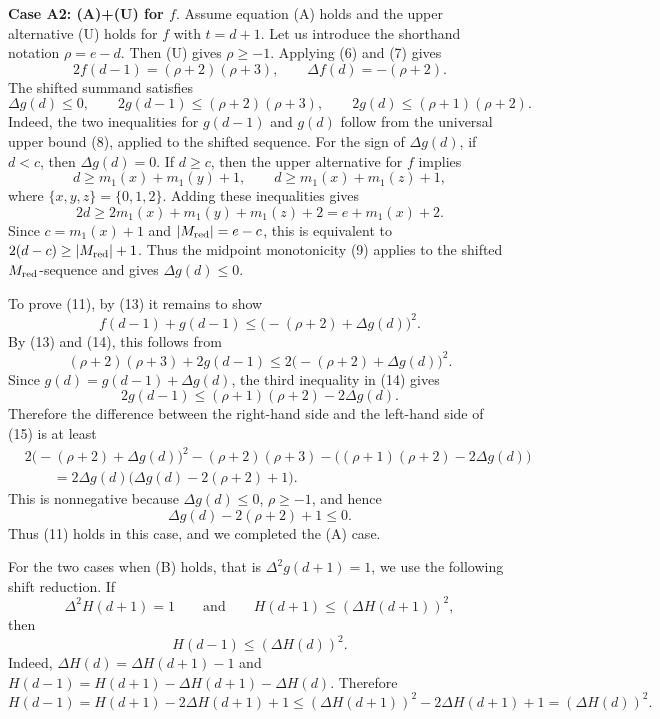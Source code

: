\medskip
\noindent\textbf{Case A2: (A)+(U) for $f$}. Assume equation (A) holds and the upper alternative (U) holds for $f$ with $t=d+1$. Let us introduce the shorthand notation $\rho=e-d$.
Then (U) gives $\rho\ge -1$.  Applying
(6) and (7) gives
\[
  2f(d-1)=(\rho+2)(\rho+3),
  \qquad
  \Delta f(d)=-(\rho+2).                                    \tag{13}
\]
The shifted summand satisfies
\[
  \Delta g(d)\le0,
  \qquad
  2g(d-1)\le (\rho+2)(\rho+3),
  \qquad
  2g(d)\le (\rho+1)(\rho+2).        \tag{14}
\]
Indeed, the two inequalities for $g(d-1)$ and
$g(d)$ follow from the universal upper bound (8),
applied to the shifted sequence.  For the sign of $\Delta g(d)$, if
$d<c$, then $\Delta g(d)=0$.  If $d\ge c$, then the upper alternative
for $f$ implies
\[
  d\ge m_1(x)+m_1(y)+1,
  \qquad
  d\ge m_1(x)+m_1(z)+1,
\]
where $\{x,y,z\}=\{0,1,2\}$.  Adding these inequalities gives
\[
  2d\ge 2m_1(x)+m_1(y)+m_1(z)+2=e+m_1(x)+2.
\]
Since $c=m_1(x)+1$ and $|M_{\rm red}|=e-c$, this is equivalent to
$2(d-c)\ge |M_{\rm red}|+1$.  Thus the midpoint monotonicity (9) applies
to the shifted $M_{\rm red}$-sequence and gives $\Delta g(d)\le0$.

To prove (11), by (13) it remains to show
\[
  f(d-1)+g(d-1)\le\bigl(-(\rho+2)+\Delta g(d)\bigr)^2.
\]
By (13) and (14), this follows from
\[
  (\rho+2)(\rho+3)+2g(d-1)
  \le
  2\bigl(-(\rho+2)+\Delta g(d)\bigr)^2.                    \tag{15}
\]
Since $g(d)=g(d-1)+\Delta g(d)$, the third inequality in (14) gives
\[
  2g(d-1)
  \le
  (\rho+1)(\rho+2)-2\Delta g(d).
\]
Therefore the difference between the right-hand side and the left-hand
side of (15) is at least
\begin{align*}
&2\bigl(-(\rho+2)+\Delta g(d)\bigr)^2
  -(\rho+2)(\rho+3)
  -\bigl((\rho+1)(\rho+2)-2\Delta g(d)\bigr)  \\
&\qquad
=
2\Delta g(d)\bigl(\Delta g(d)-2(\rho+2)+1\bigr).
\end{align*}
This is nonnegative because $\Delta g(d)\le0$, $\rho\ge-1$, and hence
\[
  \Delta g(d)-2(\rho+2)+1\le0.
\]
Thus (11) holds in this case, and we completed the (A) case.

For the two cases when (B) holds, that is $\Delta^2g(d+1)=1$, we use the following
shift reduction.  If
\[
  \Delta^2H(d+1)=1
  \qquad\text{and}\qquad
  H(d+1)\le(\Delta H(d+1))^2,
\]
then
\[
  H(d-1)\le(\Delta H(d))^2.                                \tag{16}
\]
Indeed, $\Delta H(d)=\Delta H(d+1)-1$ and $H(d-1)=H(d+1)-\Delta H(d+1)-\Delta H(d)$.
Therefore
\[
  H(d-1)
  =
  H(d+1)-2\Delta H(d+1)+1
  \le
  (\Delta H(d+1))^2-2\Delta H(d+1)+1
  =
  (\Delta H(d))^2.
\]

